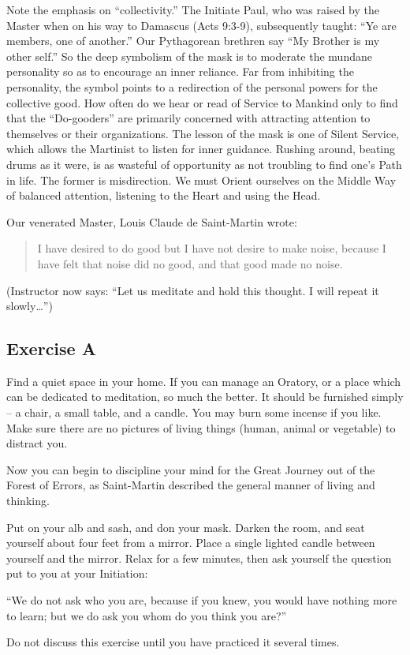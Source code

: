 Note the emphasis on ``collectivity.'' The Initiate Paul, who was raised by the Master when on his way
to Damascus (Acts 9:3-9), subsequently taught: ``Ye are members, one of another.'' Our Pythagorean
brethren say ``My Brother is my other self.'' So the deep symbolism of the mask is to moderate the
mundane personality so as to encourage an inner reliance. Far from inhibiting the personality, the
symbol points to a redirection of the personal powers for the collective good. How often do we hear or
read of Service to Mankind only to find that the ``Do-gooders'' are primarily concerned with attracting 
attention to themselves or their organizations. The lesson of the mask is one of Silent Service, which
allows the Martinist to listen for inner guidance. Rushing around, beating drums as it were, is as
wasteful of opportunity as not troubling to find one’s Path in life. The former is misdirection. We must
Orient ourselves on the Middle Way of balanced attention, listening to the Heart and using the Head. 

Our venerated Master, Louis Claude de Saint-Martin wrote: 

\begin{quote}
	I have desired to do good but I have not desire to make noise, because I have felt that noise did no
	good, and that good made no noise.
\end{quote}

(Instructor now says: ``Let us meditate and hold this thought. I will repeat it slowly\ldots'')

\subsection{Exercise A}

Find a quiet space in your home. If you can manage an Oratory, or a place which can be
dedicated to meditation, so much the better. It should be furnished simply – a chair, a small
table, and a candle. You may burn some incense if you like. Make sure there are no pictures of
living things (human, animal or vegetable) to distract you.

Now you can begin to discipline your mind for the Great Journey out of the Forest of Errors, as
Saint-Martin described the general manner of living and thinking.

Put on your alb and sash, and don your mask. Darken the room, and seat yourself about four
feet from a mirror. Place a single lighted candle between yourself and the mirror. Relax for a
few minutes, then ask yourself the question put to you at your Initiation:

``We do not ask who you are, because if you knew, you would have nothing more to learn; but
we do ask you whom do you think you are?''

Do not discuss this exercise until you have practiced it several times.
